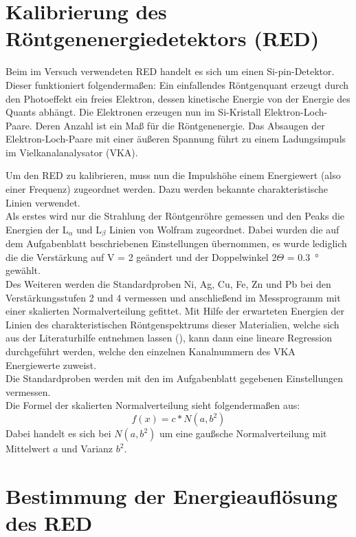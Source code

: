\section{Kalibrierung des Röntgenenergiedetektors (RED)}

Beim im Versuch verwendeten RED handelt es sich um einen Si-pin-Detektor. Dieser funktioniert folgendermaßen: Ein einfallendes Röntgenquant erzeugt durch den Photoeffekt ein freies Elektron, dessen kinetische Energie von der Energie des Quants abhängt.
Die Elektronen erzeugen nun im Si-Kristall Elektron-Loch-Paare. Deren Anzahl ist ein Maß für die Röntgenenergie. Das Absaugen der Elektron-Loch-Paare mit einer äußeren Spannung führt zu einem Ladungsimpuls im Vielkanalanalysator (VKA).

Um den RED zu kalibrieren, muss nun die Impulshöhe einem Energiewert (also einer Frequenz) zugeordnet werden. Dazu werden bekannte charakteristische Linien verwendet.\\
Als erstes wird nur die Strahlung der Röntgenröhre gemessen und den Peaks die Energien der L$_\alpha$ und L$_\beta$ Linien von Wolfram zugeordnet. Dabei wurden die auf dem Aufgabenblatt beschriebenen Einstellungen übernommen, es wurde lediglich die die Verstärkung auf V = 2 geändert und der Doppelwinkel 2$\Theta$ = \SI{0.3}{\degree} gewählt.\\
Des Weiteren werden die Standardproben Ni, Ag, Cu, Fe, Zn und Pb bei den Verstärkungsstufen 2 und 4 vermessen und anschließend im Messprogramm 
mit einer skalierten Normalverteilung gefittet. Mit Hilfe der erwarteten Energien der Linien des charakteristischen Röntgenspektrums dieser Materialien, welche sich aus der Literaturhilfe entnehmen lassen (\cite{litmap}), kann dann eine lineare Regression durchgeführt werden, welche den einzelnen Kanalnummern des VKA Energiewerte zuweist.\\
Die Standardproben werden mit den im Aufgabenblatt gegebenen Einstellungen vermessen.\\
Die Formel der skalierten Normalverteilung sieht folgenderma\ss en aus:
\begin{equation}
	f(x) = c*N(a,b^2)
	\label{gauss_scale}
\end{equation}
Dabei handelt es sich bei $N(a,b^{2})$ um eine gau\ss sche Normalverteilung mit Mittelwert $a$ und Varianz $b^{2}$.

\section{Bestimmung der Energieauflösung des RED}

